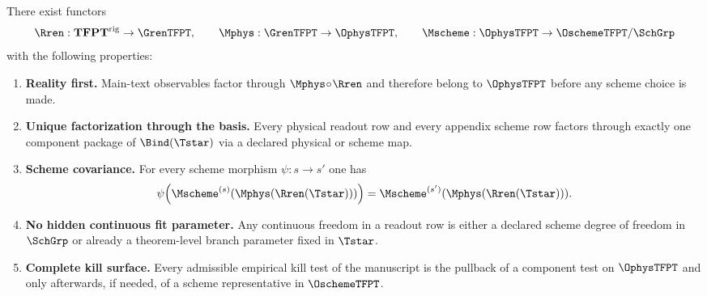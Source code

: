 \begin{theorem}
\label{thm:operational-completeness}
There exist functors
\[
\Rren:\mathbf{TFPT}^{\mathrm{rig}}\to\GrenTFPT,
\qquad
\Mphys:\GrenTFPT\to\OphysTFPT,
\qquad
\Mscheme:\OphysTFPT\to\OschemeTFPT/\SchGrp
\]
with the following properties:
\begin{enumerate}[label=\textbf{(O\arabic*)}, leftmargin=2em, topsep=3pt, itemsep=3pt]
    \item \textbf{Reality first.}
    Main-text observables factor through $\Mphys\!\circ\!\Rren$ and therefore belong to
    $\OphysTFPT$ before any scheme choice is made.
    \item \textbf{Unique factorization through the basis.}
    Every physical readout row and every appendix scheme row factors through exactly one component
    package of $\Bind(\Tstar)$ via a declared physical or scheme map.
    \item \textbf{Scheme covariance.}
    For every scheme morphism $\psi:s\to s'$ one has
    \[
    \psi\!\left(\Mscheme^{(s)}(\Mphys(\Rren(\Tstar)))\right)
    =
    \Mscheme^{(s')}(\Mphys(\Rren(\Tstar))).
    \]
    \item \textbf{No hidden continuous fit parameter.}
    Any continuous freedom in a readout row is either a declared scheme degree of freedom in
    $\SchGrp$ or already a theorem-level branch parameter fixed in $\Tstar$.
    \item \textbf{Complete kill surface.}
    Every admissible empirical kill test of the manuscript is the pullback of a component test on
    $\OphysTFPT$ and only afterwards, if needed, of a scheme representative in $\OschemeTFPT$.
\end{enumerate}
\end{theorem}

